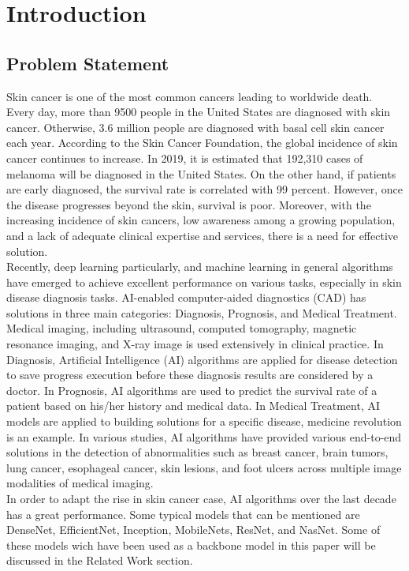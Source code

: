 \section{Introduction}
\subsection{Problem Statement}
Skin cancer is one of the most common cancers leading to worldwide death. Every day, more than 9500\cite{03358} people in the United States are diagnosed with skin cancer. Otherwise, 3.6\cite{03358} million people are diagnosed with basal cell skin cancer each year. According to the Skin Cancer Foundation, the global incidence of skin cancer continues to increase\cite{11872}. In 2019, it is estimated that 192,310 cases of melanoma will be diagnosed in the United States\cite{11872}. On the other hand, if patients are early diagnosed, the survival rate is correlated with 99 percent. However, once the disease progresses beyond the skin, survival is poor\cite{11872}. Moreover, with the increasing incidence of skin cancers, low awareness among a growing population, and a lack of adequate clinical expertise and services, there is a need for effective solution. \\
Recently, deep learning particularly, and machine learning in general algorithms have emerged to achieve excellent performance on various tasks, especially in skin disease diagnosis tasks. AI-enabled computer-aided diagnostics (CAD) has solutions in three main categories: Diagnosis, Prognosis, and Medical Treatment. Medical imaging, including ultrasound, computed tomography, magnetic resonance imaging, and X-ray image is used extensively in clinical practice. In Diagnosis, Artificial Intelligence (AI) algorithms are applied for disease detection to save progress execution before these diagnosis results are considered by a doctor. In Prognosis, AI algorithms are used to predict the survival rate of a patient based on his/her history and medical data. In Medical Treatment, AI models are applied to building solutions for a specific disease, medicine revolution is an example. In various studies, AI algorithms have provided various end-to-end solutions in the detection of abnormalities such as breast cancer, brain tumors, lung cancer, esophageal cancer, skin lesions, and foot ulcers across multiple image modalities of medical imaging\cite{11872}. \\
In order to adapt the rise in skin cancer case, AI algorithms over the last decade has a great performance. Some typical models that can be mentioned are DenseNet\cite{06993}, EfficientNet\cite{04861}, Inception\cite{00567}, MobileNets\cite{04861}\cite{04381}\cite{02244}, ResNet\cite{03385}\cite{05027}, and NasNet\cite{07012}. Some of these models wich have been used as a backbone model in this paper will be discussed in the Related Work section. \\

